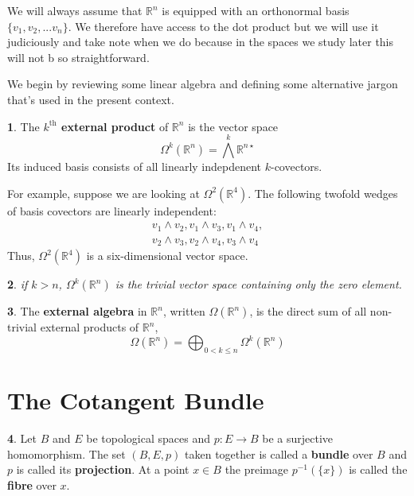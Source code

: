 \documentclass[oneside,english]{amsbook}
\numberwithin{section}{chapter}
\theoremstyle{plain}
\newtheorem{thm}{\protect\theoremname}
\theoremstyle{definition}
\newtheorem{defn}[thm]{\protect\definitionname}
\providecommand{\definitionname}{Definition}
\providecommand{\theoremname}{Theorem}
\begin{document}
			We will always assume that $\mathbb{R}^n$ is equipped with an orthonormal basis $\{v_1, v_2, ... v_n\}$. We therefore have access to the dot product but we will use it judiciously and take note when we do because in the spaces we study later this will not b so straightforward.
			
			We begin by reviewing some linear algebra and defining some alternative jargon that's used in the present context.
			
			\begin{defn}
				The \textbf{$k^{\text{th}}$ external product} of $\mathbb{R}^{n}$ is the vector space
					\[
						\Omega^k(\mathbb{R}^{n}) = \bigwedge^k \mathbb{R}^{n\star}
					\] 
				Its induced basis consists of all linearly indepdenent $k$-covectors.
			\end{defn}
			
			For example, suppose we are looking at $\Omega^2(\mathbb{R}^{4})$. The following twofold wedges of basis covectors are linearly independent:
				\begin{align}[c]
					v_1\wedge v_2, v_1\wedge v_3, v_1\wedge v_4, \\
					v_2\wedge v_3, v_2\wedge v_4, v_3\wedge v_4
				\end{align}
			Thus, $\Omega^2(\mathbb{R}^{4})$ is a six-dimensional vector space.
			
			\begin{thm}
				if $k > n$, $\Omega^k(\mathbb{R}^{n})$ is the trivial vector space containing only the zero element.
			\end{thm}
			
			\begin{defn}
				The \textbf{external algebra} in $\mathbb{R}^n$, written $\Omega(\mathbb{R}^n)$, is the direct sum of all non-trivial external products of $\mathbb{R}^n$,
				\[
					\Omega(\mathbb{R}^n) = \bigoplus_{0<k\le n}\Omega^k(\mathbb{R}^n)
				\]
			\end{defn}
			
		\section{The Cotangent Bundle}
		
			\begin{defn}
				Let $B$ and $E$ be topological spaces and $p:E\to B$ be a surjective homomorphism. The set $(B, E, p)$ taken together is called a \textbf{bundle} over $B$ and $p$ is called its \textbf{projection}. At a point $x\in B$ the preimage $p^{-1}(\{x\})$ is called the \textbf{fibre} over $x$.
			\end{defn}			
			
\end{document}
